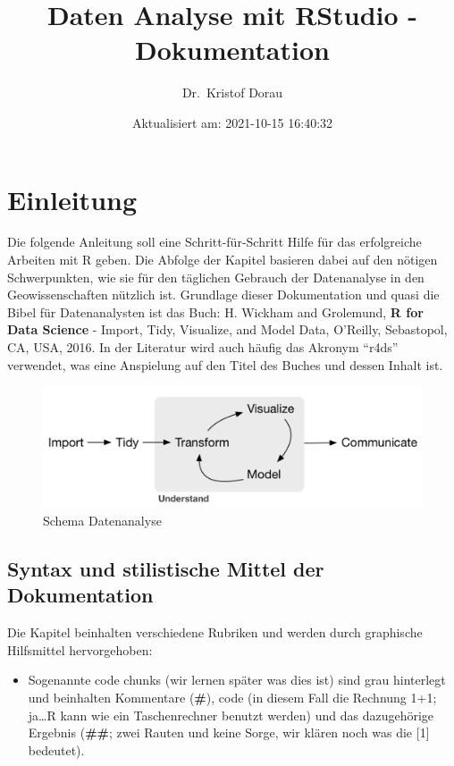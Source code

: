\documentclass[
]{article}
\title{Daten Analyse mit RStudio - Dokumentation}
\author{Dr.~Kristof Dorau}
\date{Aktualisiert am: 2021-10-15 16:40:32}
\providecommand{\tightlist}{%
  \setlength{\itemsep}{0pt}\setlength{\parskip}{0pt}}
\begin{document}
\maketitle

{
\setcounter{tocdepth}{2}
\tableofcontents
}
\hypertarget{einleitung}{%
\section{Einleitung}\label{einleitung}}

Die folgende Anleitung soll eine Schritt-für-Schritt Hilfe für das erfolgreiche Arbeiten mit R geben. Die Abfolge der Kapitel basieren dabei auf den nötigen Schwerpunkten, wie sie für den täglichen Gebrauch der Datenanalyse in den Geowissenschaften nützlich ist. Grundlage dieser Dokumentation und quasi die Bibel für Datenanalysten ist das Buch: H. Wickham and Grolemund, \textbf{R for Data Science} - Import, Tidy, Visualize, and Model Data, O'Reilly, Sebastopol, CA, USA, 2016. In der Literatur wird auch häufig das Akronym ``r4ds'' verwendet, was eine Anspielung auf den Titel des Buches und dessen Inhalt ist.

\begin{figure}

{\centering \includegraphics[width=1\linewidth]{images/001} 

}

\caption{Schema Datenanalyse}\label{fig:unnamed-chunk-2}
\end{figure}

\hypertarget{syntax-und-stilistische-mittel-der-dokumentation}{%
\subsection{Syntax und stilistische Mittel der Dokumentation}\label{syntax-und-stilistische-mittel-der-dokumentation}}

Die Kapitel beinhalten verschiedene Rubriken und werden durch graphische Hilfsmittel hervorgehoben:

\begin{itemize}
\tightlist
\item
  Sogenannte code chunks (wir lernen später was dies ist) sind grau hinterlegt und beinhalten Kommentare (\textbf{\#}), code (in diesem Fall die Rechnung 1+1; ja\ldots R kann wie ein Taschenrechner benutzt werden) und das dazugehörige Ergebnis (\textbf{\#\#}; zwei Rauten und keine Sorge, wir klären noch was die {[}1{]} bedeutet).
\end{itemize}
\end{document}
